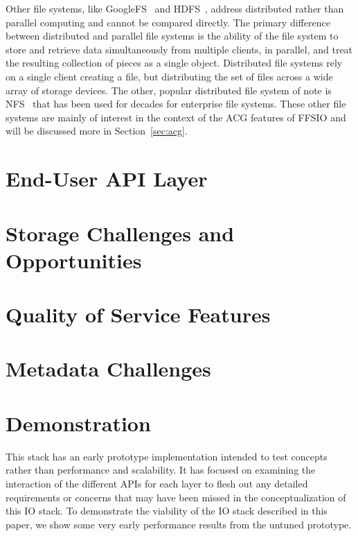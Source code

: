 \documentclass{sig-alt-gov2}
\begin{document}
Other file systems, like GoogleFS~\cite{ghemawat:googlefs} and
HDFS~\cite{Shvachko:2010:hdfs}, address distributed rather than parallel
computing and cannot be compared directly.
The primary difference between
distributed and parallel file systems is the ability of the file system to
store and retrieve data simultaneously from multiple clients, in parallel, and
treat the resulting collection of pieces as a single object.  Distributed file
systems rely on a single client creating a file, but distributing the set of
files across a wide array of storage devices.
The other, popular distributed
file system of note is NFS~\cite{powlowski:1994:nfs3} that has been used for
decades for enterprise file systems.
These other file systems are mainly of
interest in the context of the ACG features of FFSIO and will be discussed more
in Section~\ref{sec:acg}.

\section{End-User API Layer}
\label{sec:end-user}

\section{Storage Challenges and Opportunities}
\label{sec:storage}

\section{Quality of Service Features}
\label{sec:qos}

\section{Metadata Challenges}
\label{sec:metadata}

\section{Demonstration}
\label{sec:evaluation}

This stack has an early prototype implementation intended to test concepts
rather than performance and scalability. It has focused on examining the
interaction of the different APIs for each layer to flesh out any detailed
requirements or concerns that may have been missed in the conceptualization of
this IO stack. To demonstrate the viability of the IO stack described in this
paper, we show some very early performance results from the untuned prototype.
\end{document}
